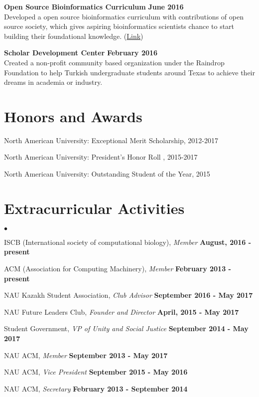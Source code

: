 \documentclass[margin,line]{res}
\newenvironment{list2}{
  \begin{list}{$\bullet$}{%
      \setlength{\itemsep}{0in}
      \setlength{\parsep}{0in} \setlength{\parskip}{0in}
      \setlength{\topsep}{0in} \setlength{\partopsep}{0in} 
      \setlength{\leftmargin}{0.2in}}}{\end{list}}
\begin{document}
\begin{resume}

{\bf Open Source Bioinformatics Curriculum} \hfill {\bf June  2016}\\
Developed a open source bioinformatics curriculum with contributions of open source society, which gives aspiring bioinformatics scientists chance to start building their foundational knowledge. (\href{https://github.com/open-source-society/bioinformatics}{Link})

{\bf Scholar Development Center} \hfill {\bf February  2016}\\
Created a non-profit community based organization under the Raindrop Foundation to help Turkish undergraduate students around Texas to achieve their dreams in academia or industry.


\section{\sc Honors and Awards}

North American University: Exceptional Merit Scholarship, 2012-2017

\vspace*{-2.5mm}
North American University: President's Honor Roll , 2015-2017

\vspace*{-2.5mm}
North American University: Outstanding Student of the Year, 2015


\section{\sc Extracurricular Activities}
\begin{list2}
\item ISCB (International society of computational biology), {\em Member} \hfill {\bf August, 2016 - present}
\item ACM (Association for Computing Machinery), {\em Member} \hfill  {\bf February 2013 - present}
\item NAU Kazakh Student Association, {\em Club Advisor} \hfill {\bf September 2016 - May 2017} 
\item NAU Future Leaders Club, {\em Founder and Director} \hfill {\bf April, 2015 - May 2017}
\item Student Government, {\em VP of Unity and Social Justice} \hfill  {\bf September 2014 - May 2017}
\item NAU ACM, {\em Member} \hfill {\bf September 2013 - May 2017}
\item NAU ACM, {\em Vice President} \hfill  {\bf September 2015 - May 2016}
\item NAU ACM, {\em Secretary} \hfill  {\bf February 2013 - September 2014}
\end{list2}


\end{resume}
\end{document}
